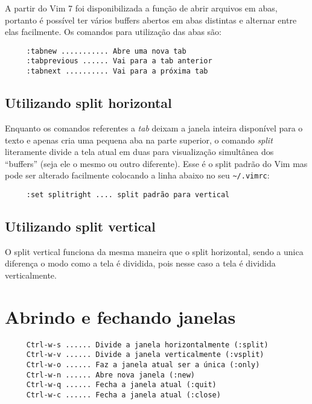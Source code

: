 A partir do Vim 7 foi disponibilizada a função de abrir arquivos em
abas, portanto é possível ter vários buffers abertos em abas distintas
e alternar entre elas facilmente. Os comandos para utilização das abas
são:

\begin{verbatim}
     :tabnew ........... Abre uma nova tab
     :tabprevious ...... Vai para a tab anterior
     :tabnext .......... Vai para a próxima tab
\end{verbatim}


\subsection{Utilizando split horizontal}

Enquanto os comandos referentes a {\em tab} deixam a janela inteira disponível
para o texto e apenas cria uma pequena aba na parte superior, o comando {\em split} 
literamente divide a tela atual em duas para visualização simultânea
dos ``buffers'' (seja ele o mesmo ou outro diferente).
Esse é o split padrão do Vim mas pode ser alterado facilmente colocando a linha
abaixo no seu \verb|~/.vimrc|:

\begin{verbatim}
     :set splitright .... split padrão para vertical
\end{verbatim}


\subsection{Utilizando split vertical}

O split vertical funciona da mesma maneira que o split horizontal,
sendo a unica diferença o modo como a tela é dividida, pois nesse
caso a tela é dividida verticalmente.


\section{Abrindo e fechando janelas }

\begin{verbatim}
     Ctrl-w-s ...... Divide a janela horizontalmente (:split)
     Ctrl-w-v ...... Divide a janela verticalmente (:vsplit)
     Ctrl-w-o ...... Faz a janela atual ser a única (:only)
     Ctrl-w-n ...... Abre nova janela (:new)
     Ctrl-w-q ...... Fecha a janela atual (:quit)
     Ctrl-w-c ...... Fecha a janela atual (:close)
\end{verbatim}

